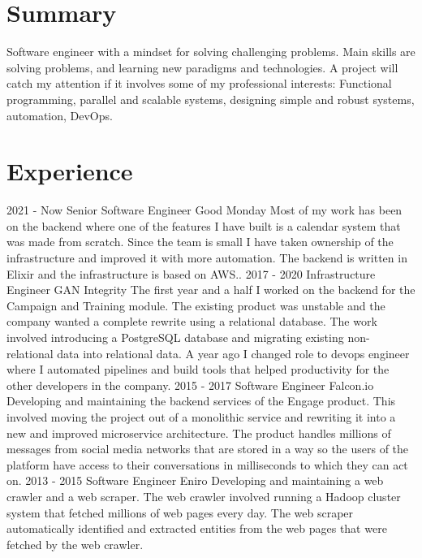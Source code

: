 \documentclass[]{friggeri-cv}
\begin{document}
\section{Summary}
Software engineer with a mindset for solving challenging problems. Main skills are solving problems, and learning new paradigms and technologies. A project will catch my attention if it involves some of my professional interests: Functional programming, parallel and scalable systems, designing simple and robust systems, automation, DevOps.

\section{Experience}
\begin{entrylist}
    \entry
    {2021 - Now}
    {Senior Software Engineer}
    {Good Monday}
    {Most of my work has been on the backend where one of the features I have built is a calendar system that was made from scratch. Since the team is small I have taken ownership of the infrastructure and improved it with more automation. The backend is written in Elixir and the infrastructure is based on AWS..}
    \entry
    {2017 - 2020}
    {Infrastructure Engineer}
    {GAN Integrity}
    {The first year and a half I worked on the backend for the Campaign and Training module. The existing product was unstable and the company wanted a complete rewrite using a relational database.  
    The work involved introducing a PostgreSQL database and migrating existing non-relational data into relational data.
    A year ago I changed role to devops engineer where I automated pipelines and build tools that helped productivity for the other developers in the company.}
    \entry
    {2015 - 2017}
    {Software Engineer}
    {Falcon.io}
    {Developing and maintaining the backend services of the Engage product. This involved moving the project out of a monolithic service and rewriting it into a new and improved microservice architecture. The product handles millions of messages from social media networks that are stored in a way so the users of the platform have access to their conversations in milliseconds to which they can act on.}
    \entry
    {2013 - 2015}
    {Software Engineer}
    {Eniro}
    {Developing and maintaining a web crawler and a web scraper. The web crawler involved running a Hadoop cluster system that fetched millions of web pages every day. The web scraper automatically identified and extracted entities from the web pages that were fetched by the web crawler.}
\end{entrylist}
\\
\end{document}
